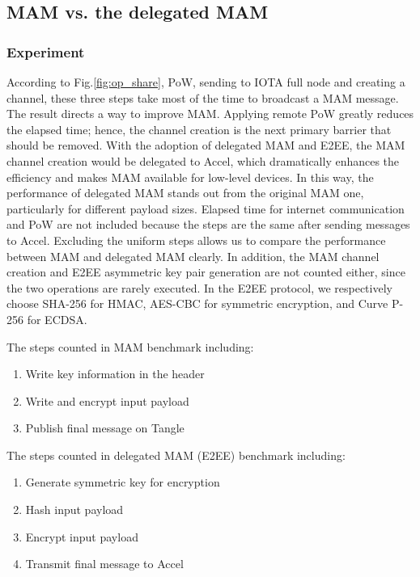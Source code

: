 \documentclass[10pt, conference, compsocconf]{IEEEtran}
\begin{document}
\subsection{MAM vs. the delegated MAM}
\label{section:smart_contract_evaluation}
\subsubsection{Experiment}
According to Fig.\ref{fig:op_share}, PoW, sending to IOTA full node and creating a channel, these three steps take most of the time to broadcast a MAM message. The result directs a way to improve MAM. Applying remote PoW greatly reduces the elapsed time; hence, the channel creation is the next primary barrier that should be removed. With the adoption of delegated MAM and E2EE, the MAM channel creation would be delegated to Accel, which dramatically enhances the efficiency and makes MAM available for low-level devices. In this way, the performance of delegated MAM stands out from the original MAM one, particularly for different payload sizes. Elapsed time for internet communication and PoW are not included because the steps are the same after sending messages to Accel. Excluding the uniform steps allows us to compare the performance between MAM and delegated MAM clearly. In addition, the MAM channel creation and E2EE asymmetric key pair generation are not counted either, since the two operations are rarely executed. In the E2EE protocol, we respectively choose SHA-256 for HMAC, AES-CBC for symmetric encryption, and Curve P-256 for ECDSA.

The steps counted in MAM benchmark including:
\begin{enumerate}
    \item Write key information in the header
    \item Write and encrypt input payload
    \item Publish final message on Tangle
\end{enumerate}

The steps counted in delegated MAM (E2EE) benchmark including:
\begin{enumerate}
    \item Generate symmetric key for encryption
    \item Hash input payload
    \item Encrypt input payload
    \item Transmit final message to Accel
\end{enumerate}
\end{document}
